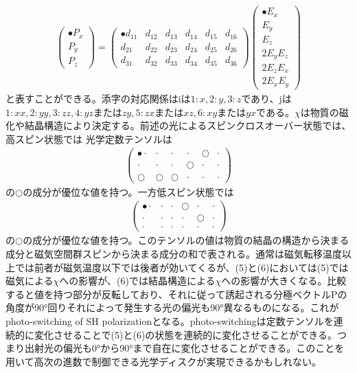 \documentclass{jsarticle}
\begin{document}
\begin{eqnarray}
\left( \begin{array}{c}
•P_x\\P_y\\P_z
\end{array}\right)
=\left( \begin{array}{cccccc}
•d_{11}&d_{12}&d_{13}&d_{14}&d_{15}&d_{16}\\d_{21}&d_{22}&d_{23}&d_{24}&d_{25}&d_{26}\\d_{31}&d_{32}&d_{33}&d_{34}&d_{35}&d_{36}
\end{array}\right)\left( \begin{array}{c}
•E_x\\E_y\\E_z\\2E_yE_z\\2E_zE_x\\2E_xE_y
\end{array}\right)
\end{eqnarray}
と表すことができる。添字の対応関係はiは$1:x,2:y,3:z$であり、jは$1:xx,2:yy,3:zz,4:yzまたはzy,5:zxまたはxz,6:xyまたはyx$である。$\chi$は物質の磁化や結晶構造により決定する。前述の光によるスピンクロスオーバー状態では、高スピン状態では 光学定数テンソルは
\begin{eqnarray}
\left( \begin{array}{cccccc}
•\cdot & \cdot &\cdot &\cdot & \bigcirc &\cdot \\ \cdot & \cdot &\cdot & \bigcirc &\cdot  &\cdot \\ \bigcirc &\bigcirc & \bigcirc & \cdot &\cdot & \cdot
\end{array}\right)
\end{eqnarray}
の$\bigcirc$の成分が優位な値を持つ。一方低スピン状態では
\begin{eqnarray}
\left( \begin{array}{cccccc}
•\cdot & \cdot &\cdot  & \bigcirc &\cdot &\cdot \\ \cdot & \cdot &\cdot &\cdot & \bigcirc   &\cdot \\   \cdot &\cdot & \cdot & \cdot &\cdot & \cdot
\end{array}\right)
\end{eqnarray}
の$\bigcirc$の成分が優位な値を持つ。このテンソルの値は物質の結晶の構造から決まる成分と磁気空間群スピンから決まる成分の和で表される。通常は磁気転移温度以上では前者が磁気温度以下では後者が効いてくるが、(5)と(6)においては(5)では磁気による$\chi$への影響が、(6)では結晶構造による$\chi$への影響が大きくなる。比較すると値を持つ部分が反転しており、それに従って誘起される分極ベクトルPの角度が90°回りそれによって発生する光の偏光も90°異なるものになる。これがphoto-switching of SH polarizationとなる。photo-switchingは定数テンソルを連続的に変化させることで(5)と(6)の状態を連続的に変化させることができる。つまり出射光の偏光も0°から90°まで自在に変化させることができる。このことを用いて高次の進数で制御できる光学ディスクが実現できるかもしれない。\\
\end{document}
